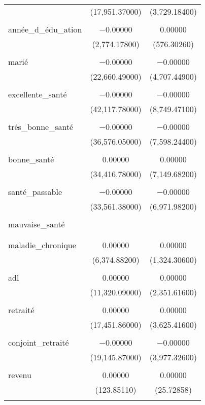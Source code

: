 \documentclass[
  14pt,
  french,
]{article}
\begin{document}
\begin{table}[!htbp]
\begin{tabular}{@{\extracolsep{5pt}}lcc}
  & (17,951.37000) & (3,729.18400) \\ 
  & & \\ 
 année\_d\_édu\_ation & $-$0.00000 & 0.00000 \\ 
  & (2,774.17800) & (576.30260) \\ 
  & & \\ 
 marié & $-$0.00000 & $-$0.00000 \\ 
  & (22,660.49000) & (4,707.44900) \\ 
  & & \\ 
 excellente\_santé & $-$0.00000 & $-$0.00000 \\ 
  & (42,117.78000) & (8,749.47100) \\ 
  & & \\ 
 trés\_bonne\_santé & $-$0.00000 & $-$0.00000 \\ 
  & (36,576.05000) & (7,598.24400) \\ 
  & & \\ 
 bonne\_santé & 0.00000 & 0.00000 \\ 
  & (34,416.78000) & (7,149.68200) \\ 
  & & \\ 
 santé\_passable & $-$0.00000 & $-$0.00000 \\ 
  & (33,561.38000) & (6,971.98200) \\ 
  & & \\ 
 mauvaise\_santé &  &  \\ 
  &  &  \\ 
  & & \\ 
 maladie\_chronique & 0.00000 & 0.00000 \\ 
  & (6,374.88200) & (1,324.30600) \\ 
  & & \\ 
 adl & 0.00000 & 0.00000 \\ 
  & (11,320.09000) & (2,351.61600) \\ 
  & & \\ 
 retraité & 0.00000 & 0.00000 \\ 
  & (17,451.86000) & (3,625.41600) \\ 
  & & \\ 
 conjoint\_retraité & $-$0.00000 & $-$0.00000 \\ 
  & (19,145.87000) & (3,977.32600) \\ 
  & & \\ 
 revenu & 0.00000 & 0.00000 \\ 
  & (123.85110) & (25.72858) \\ 
  & & \\ 

\end{tabular}
\end{table}
\end{document}
